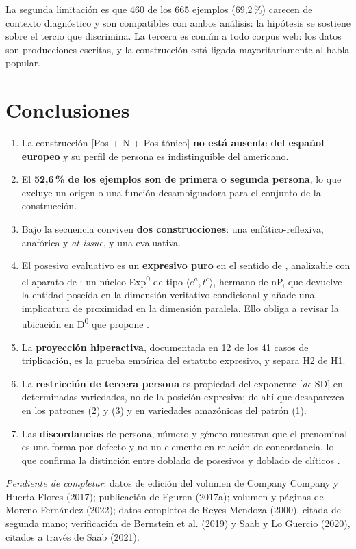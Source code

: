 \documentclass[12pt,a4paper]{article}
\begin{document}
La segunda limitación es que 460 de los 665 ejemplos (69,2\,\%) carecen de contexto diagnóstico y son compatibles con ambos análisis: la hipótesis se sostiene sobre el tercio que discrimina. La tercera es común a todo corpus web: los datos son producciones escritas, y la construcción está ligada mayoritariamente al habla popular.

\section{Conclusiones}

\begin{enumerate}[label=\arabic*.,leftmargin=1.5em]
\item La construcción [Pos + N + Pos tónico] \textbf{no está ausente del español europeo} y su perfil de persona es indistinguible del americano.
\item El \textbf{52,6\,\% de los ejemplos son de primera o segunda persona}, lo que excluye un origen o una función desambiguadora para el conjunto de la construcción.
\item Bajo la secuencia conviven \textbf{dos construcciones}: una enfático-reflexiva, anafórica y \textit{at-issue}, y una evaluativa.
\item El posesivo evaluativo es un \textbf{expresivo puro} en el sentido de \textcite{potts2005}, analizable con el aparato de \textcite{saab2021}: un núcleo Exp\textsuperscript{0} de tipo $\langle e^a, t^c \rangle$, hermano de nP, que devuelve la entidad poseída en la dimensión veritativo-condicional y añade una implicatura de proximidad en la dimensión paralela. Ello obliga a revisar la ubicación en D\textsuperscript{0} que propone \textcite{eguren2018}.
\item La \textbf{proyección hiperactiva}, documentada en 12 de los 41 casos de triplicación, es la prueba empírica del estatuto expresivo, y separa H2 de H1.
\item La \textbf{restricción de tercera persona} es propiedad del exponente [\textit{de} SD] en determinadas variedades, no de la posición expresiva; de ahí que desaparezca en los patrones (2) y (3) y en variedades amazónicas del patrón (1).
\item Las \textbf{discordancias} de persona, número y género muestran que el prenominal es una forma por defecto y no un elemento en relación de concordancia, lo que confirma la distinción entre doblado de posesivos y doblado de clíticos \parencite{eguren2019}.
\end{enumerate}

\clearpage
\nocite{camacho1995,eguren2017a,napuri2018,saabloguercio2020}
\printbibliography[title={Referencias}]

\bigskip
\noindent\textit{Pendiente de completar}: datos de edición del volumen de Company Company y Huerta Flores (2017); publicación de Eguren (2017a); volumen y páginas de Moreno-Fernández (2022); datos completos de Reyes Mendoza (2000), citada de segunda mano; verificación de Bernstein et al. (2019) y Saab y Lo Guercio (2020), citados a través de Saab (2021).
\end{document}
